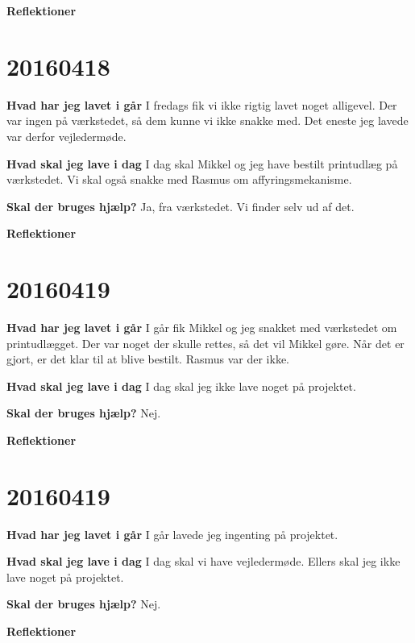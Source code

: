 \documentclass{article}
\begin{document}
	\textbf{Reflektioner}
	
	\section{20160418}
	
	\textbf{Hvad har jeg lavet i går}
	I fredags fik vi ikke rigtig lavet noget alligevel. Der var ingen på værkstedet, så dem kunne vi ikke snakke med. Det eneste jeg lavede var derfor vejledermøde.  
	
	\textbf{Hvad skal jeg lave i dag}
	I dag skal Mikkel og jeg have bestilt printudlæg på værkstedet. Vi skal også snakke med Rasmus om affyringsmekanisme. 
	
	\textbf{Skal der bruges hjælp?}
	Ja, fra værkstedet. Vi finder selv ud af det. 
	
	\textbf{Reflektioner}

	\section{20160419}
	
	\textbf{Hvad har jeg lavet i går}
	I går fik Mikkel og jeg snakket med værkstedet om printudlægget. Der var noget der skulle rettes, så det vil Mikkel gøre. Når det er gjort, er det klar til at blive bestilt. Rasmus var der ikke. 
	
	\textbf{Hvad skal jeg lave i dag}
	I dag skal jeg ikke lave noget på projektet. 
	
	\textbf{Skal der bruges hjælp?}
	Nej.  
	
	\textbf{Reflektioner}
	
	\section{20160419}
	
	\textbf{Hvad har jeg lavet i går}
	I går lavede jeg ingenting på projektet. 
	
	\textbf{Hvad skal jeg lave i dag}
	I dag skal vi have vejledermøde. Ellers skal jeg ikke lave noget på projektet. 
	
	\textbf{Skal der bruges hjælp?}
	Nej.  
	
	\textbf{Reflektioner}
	
	
\end{document}
